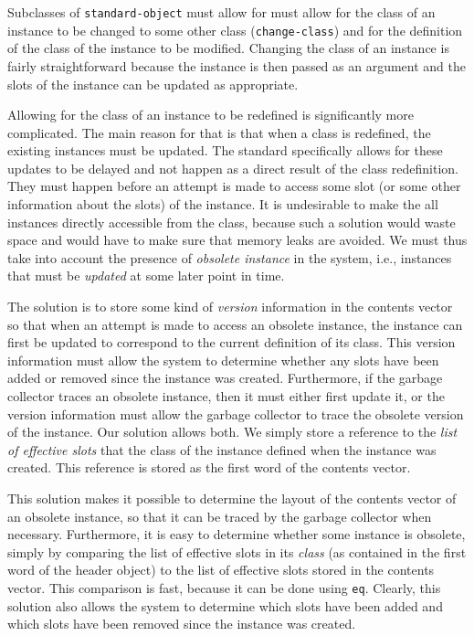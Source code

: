Subclasses of \texttt{standard-object} must allow for must allow for
the class of an instance to be changed to some other class
(\texttt{change-class}) and for the definition of the class of the
instance to be modified.  Changing the class of an instance is fairly
straightforward because the instance is then passed as an argument and
the slots of the instance can be updated as appropriate.

Allowing for the class of an instance to be redefined is significantly
more complicated.  The main reason for that is that when a class is
redefined, the existing instances must be updated.  The standard
specifically allows for these updates to be delayed and not happen as
a direct result of the class redefinition.  They must happen before an
attempt is made to access some slot (or some other information about
the slots) of the instance.  It is undesirable to make the all
instances directly accessible from the class, because such a solution
would waste space and would have to make sure that memory leaks are
avoided.  We must thus take into account the presence of
\emph{obsolete instance} in the system, i.e., instances that must be
\emph{updated} at some later point in time. 

The solution is to store some kind of \emph{version} information in
the contents vector so that when an attempt is made to access an
obsolete instance, the instance can first be updated to correspond to
the current definition of its class.  This version information must
allow the system to determine whether any slots have been added or
removed since the instance was created.  Furthermore, if the garbage
collector traces an obsolete instance, then it must either first
update it, or the version information must allow the garbage collector
to trace the obsolete version of the instance.  Our solution allows
both.  We simply store a reference to the \emph{list of effective
  slots} that the class of the instance defined when the instance was
created.  This reference is stored as the first word of the contents
vector.  

This solution makes it possible to determine the layout of the
contents vector of an obsolete instance, so that it can be traced by
the garbage collector when necessary.  Furthermore, it is easy to
determine whether some instance is obsolete, simply by comparing the
list of effective slots in its \emph{class} (as contained in the first
word of the header object) to the list of effective slots stored in
the contents vector.  This comparison is fast, because it can be done
using \texttt{eq}.  Clearly, this solution also allows the system to
determine which slots have been added and which slots have been
removed since the instance was created. 

